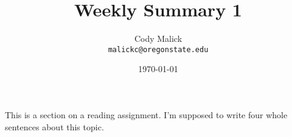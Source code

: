 \documentclass[10pt,letterpaper]{article}
\begin{document}
  \title{Weekly Summary 1}
  \author{Cody Malick\\
  \texttt{malickc@oregonstate.edu}}
  \date{\today}
  \maketitle

    This is a section on a reading assignment. I'm supposed to write four whole\\
    sentences about this topic.
\end{document}
